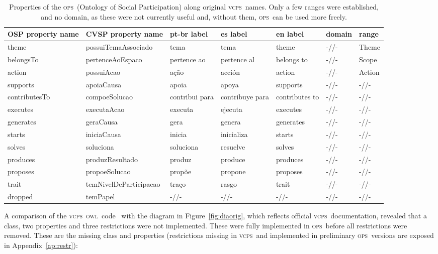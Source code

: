 \documentclass[10pt,letterpaper]{article}
\newcommand{\ops}{\textsc{ops}}
\newcommand{\vcps}{\textsc{vcps}}
\newcommand{\owl}{\textsc{owl}}
\begin{document}
\begin{table}[!h]
\begin{adjustwidth}{-2.25in}{0in} %
  \caption{Properties of the \ops\ (Ontology of Social Participation) along original \vcps\ names. Only a few ranges were established, and no domain, as these were not currently useful and, without them, \ops\ can be used more freely.}
  \begin{tabular}{|l|l||p{2.2cm}|p{2.2cm}|p{1.8cm}||l|p{1.2cm}|}\hline
{\bf OSP property name} & {\bf CVSP property name} & {\bf pt-br label} & {\bf es label} & {\bf en label} & {\bf domain} & {\bf range} \\\hline\hline
theme & possuiTemaAssociado & tema & tema & theme & -//- & Theme \\ \hline
belongsTo & pertenceAoEspaco & pertence ao & pertence al & belongs to & -//- & Scope \\ \hline
action & possuiAcao & a\c{c}\~ao & acci\'on & action & -//- & Action \\\hline\hline
supports & apoiaCausa & apoia & apoya & supports & -//- & -//- \\ \hline
contributesTo & compoeSolucao & contribui para & contribuye para & contributes to & -//- & -//- \\ \hline
executes & executaAcao & executa & ejecuta & executes & -//- & -//- \\ \hline
generates & geraCausa & gera & genera & generates & -//- & -//- \\ \hline
starts & iniciaCausa & inicia & inicializa & starts & -//- & -//- \\ \hline
solves & soluciona & soluciona & resuelve & solves & -//- & -//- \\ \hline
produces & produzResultado & produz & produce & produces & -//- & -//- \\\hline
proposes & propoeSolucao & prop\~oe & propone & proposes & -//- & -//- \\\hline
      trait & temNivelDeParticipacao & tra\c{c}o & rasgo & trait & -//- & -//- \\\hline\hline
{\color{red} dropped} & temPapel & -//-  & -//-  & -//-  & -//-  & -//- \\ \hline
  \end{tabular}
  \label{ospProps}
\end{adjustwidth}
\end{table}

A comparison of the \vcps\ \owl\ code~\cite{owlCCPtg} 
with the diagram in Figure~\ref{fig:diaorig}, which reflects official \vcps\ documentation, revealed that a class, two properties and three restrictions were not implemented. These were fully implemented in \ops\ before all restrictions were removed. These are the missing class and properties (restrictions missing in \vcps\ and implemented in preliminary \ops\ versions are exposed in Appendix~\ref{ap:restr}):
\end{document}
